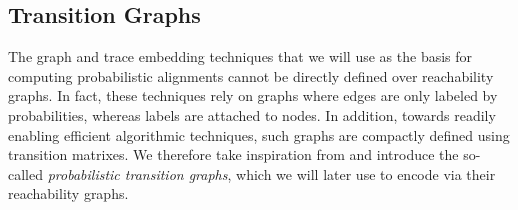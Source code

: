 %
%



\subsection{Transition Graphs}\label{subsec:ppn}

The graph and trace embedding techniques that we will use as the basis for computing probabilistic alignments cannot be directly defined over reachability graphs. In fact, these techniques rely on graphs where edges are only labeled by probabilities, whereas labels are attached to nodes. In addition, towards readily enabling efficient algorithmic techniques, such graphs are compactly defined using transition matrixes. We therefore take inspiration from \cite{GartnerFW03} and introduce the so-called \emph{probabilistic transition graphs}, which we will later use to encode  via their reachability graphs.

